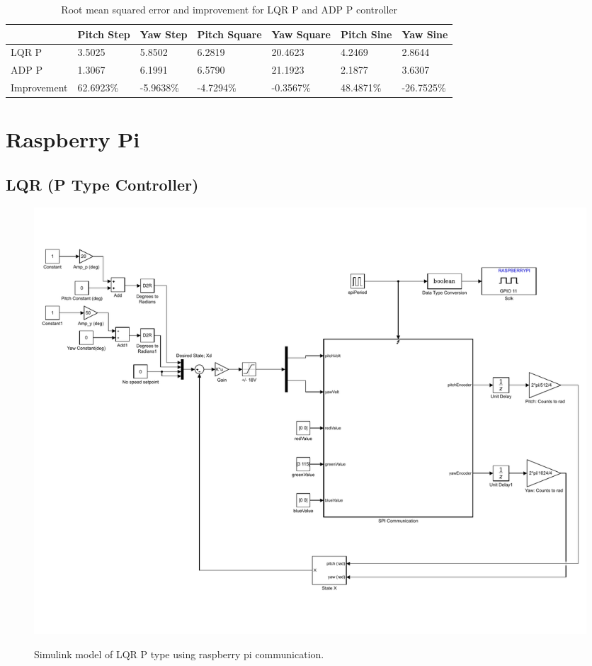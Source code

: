 \begin{table}
    \centering
    \begin{tabular}{l|l|l|l|l|l|l}
        \toprule
        \textbf{} & \textbf{Pitch Step} & \textbf{Yaw Step} & \textbf{Pitch Square} & \textbf{Yaw Square} & \textbf{Pitch Sine} & \textbf{Yaw Sine}\\
        \toprule
        LQR P & 3.5025 & 5.8502 & 6.2819 & 20.4623 & 4.2469 & 2.8644\\
        ADP P & 1.3067 & 6.1991 & 6.5790 & 21.1923 & 2.1877 & 3.6307\\
        Improvement & 62.6923\% & -5.9638\%  & -4.7294\% & -0.3567\% & 48.4871\% & -26.7525\% \\
    \end{tabular}
    \caption{Root mean squared error and improvement for LQR P and ADP P controller}
    \label{tab:RMSE_LQR_ADP}
\end{table}

\section{Raspberry Pi}

\subsection{LQR (P Type Controller)}
\begin{figure}[!htbp]
    \centering
    \includegraphics[width=.62\textwidth,keepaspectratio=true]{figs/img/LQR_RaspPi}
    \label{fig:LQR_RaspPi}
    \caption{Simulink model of LQR P type using raspberry pi communication.}
\end{figure}

